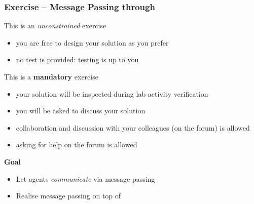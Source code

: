 \documentclass[presentation]{beamer}\mode<presentation>{\usetheme{AMSCesenaPurpleAndGold}}
\begin{document}
\begin{frame}[allowframebreaks]
	\frametitle{Exercise \currentExercise{} -- Message Passing through \linda{}}
	
	\begin{alertblock}{This is an \emph{unconstrained} exercise}
		\begin{itemize}
			\item you are free to design your solution as you prefer
			\item no test is provided: testing is up to you
		\end{itemize}
	\end{alertblock}

	\bigskip
	
	\begin{alertblock}{This is a \textbf{mandatory} exercise}
		\begin{itemize}
			\item your solution will be inspected during lab activity verification
			\item you will be asked to discuss your solution
			\item collaboration and discussion with your colleagues (on the forum) is allowed
			\item asking for help on the forum is allowed
		\end{itemize}
	\end{alertblock}

	\framebreak
	
	\begin{block}{\textbf{Goal}}
		\begin{itemize}
			\item Let agents \emph{communicate} via message-passing
			\item Realise message passing \alert{on top} of \linda{}
		\end{itemize}
	\end{block}


\end{frame}
\end{document}
